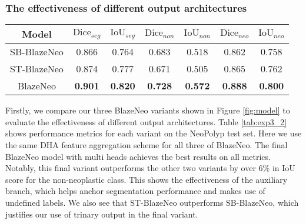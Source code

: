 \documentclass{ieeeaccess}
\newcommand{\ModelName}{BlazeNeo\xspace}
\newcommand{\DatasetName}{NeoPolyp\xspace}
\begin{document}
\subsubsection{The effectiveness of different output architectures}
\begin{table*}[ht!]
    \centering
    \caption{Performance metrics on the \DatasetName test set for the three variants of BlazeNeo using the same DHA feature aggregation scheme}
    \label{tab:exp3_2}
    \begin{tabular}{@{} c| c c c c c c @{}}
        \toprule
        
        \multicolumn{1}{c|}{Model} & \multicolumn{1}{c}{$\text{Dice}_{seg}$} & \multicolumn{1}{c}{$\text{IoU}_{seg}$} & \multicolumn{1}{c}{$\text{Dice}_{non}$} & \multicolumn{1}{c}{$\text{IoU}_{non}$} & \multicolumn{1}{c}{$\text{Dice}_{neo}$} & \multicolumn{1}{c}{$\text{IoU}_{neo}$} \\ \midrule \midrule
        SB-\ModelName              & 0.866                                   & 0.764                                  & 0.683                                   & 0.518                                  & 0.862                                   & 0.758                                  \\
        ST-\ModelName              & 0.874                                   & 0.777                                  & 0.671                                   & 0.505                                  & 0.865                                   & 0.762                                  \\
        \ModelName                 & \textbf{0.901}                          & \textbf{0.820}                         & \textbf{0.728}                          & \textbf{0.572}                         & \textbf{0.888}                          & \textbf{0.800}                         \\
        \bottomrule
    \end{tabular}
\end{table*}

Firstly, we compare our three \ModelName variants shown in Figure \ref{fig:model} to evaluate the effectiveness of different output architectures. Table \ref{tab:exp3_2} shows performance metrics for each variant on the \DatasetName test set. Here we use the same DHA feature aggregation scheme for all three of \ModelName. The final \ModelName model with multi heads achieves the best results on all metrics. Notably, this final variant outperforms the other two variants by over $6\%$ in IoU score for the non-neoplastic class. This shows the effectiveness of the auxiliary branch, which helps anchor segmentation performance and makes use of undefined labels. We also see that ST-\ModelName outperforms SB-\ModelName, which justifies our use of trinary output in the final variant.
\end{document}
